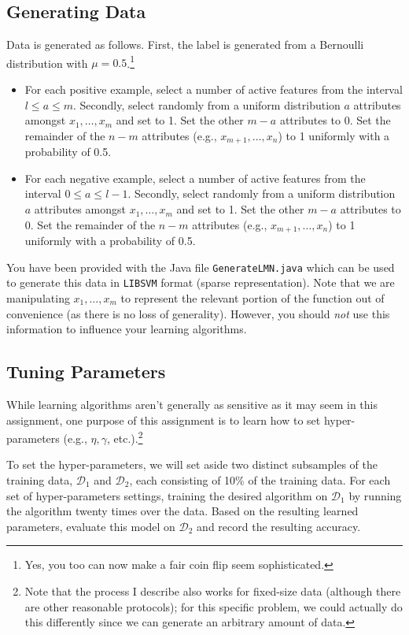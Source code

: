 \documentclass[12pt,letterpaper]{article}
\begin{document}
\subsection*{Generating Data}

Data is generated as follows.  First, the label is generated from a Bernoulli distribution with $\mu=0.5$.\footnote{Yes, you too can now make a fair coin flip seem sophisticated.}

\begin{itemize}
\item
For each positive example, select a number of active features from the interval $l \leq a \leq m$.  Secondly, select randomly from a uniform distribution $a$ attributes amongst $x_1, \ldots, x_m$ and set to 1.  Set the other $m - a$ attributes to 0.  Set the remainder of the $n-m$ attributes (e.g., $x_{m+1}, \ldots, x_{n}$) to 1 uniformly with a probability of 0.5.
\item
For each negative example, select a number of active features from the interval $0 \leq a \leq l-1$.  Secondly, select randomly from a uniform distribution $a$ attributes amongst $x_1, \ldots, x_m$ and set to 1.  Set the other $m - a$ attributes to 0.  Set the remainder of the $n-m$ attributes (e.g., $x_{m+1}, \ldots, x_{n}$) to 1 uniformly with a probability of 0.5.
\end{itemize}

You have been provided with the Java file {\tt GenerateLMN.java} which can be used to generate this data in {\tt LIBSVM} format (sparse representation).  Note that we are manipulating $x_1, \ldots, x_m$ to represent the relevant portion of the function out of convenience (as there is no loss of generality).  However, you should {\em not} use this information to influence your learning algorithms.

\subsection*{Tuning Parameters}

While learning algorithms aren't generally as sensitive as it may seem in this assignment, one purpose of this assignment is to learn how to set hyper-parameters (e.g., $\eta, \gamma$, etc.).\footnote{Note that the process I describe also works for fixed-size data (although there are other reasonable protocols); for this specific problem, we could actually do this differently since we can generate an arbitrary amount of data.}  

To set the hyper-parameters, we will set aside two distinct subsamples of the training data, $\mathcal{D}_1$ and $\mathcal{D}_2$, each consisting of 10\% of the training data.  For each set of hyper-parameters settings, training the desired algorithm on $\mathcal{D}_1$ by running the algorithm twenty times over the data.  Based on the resulting learned parameters, evaluate this model on $\mathcal{D}_2$ and record the resulting accuracy.
\end{document}
